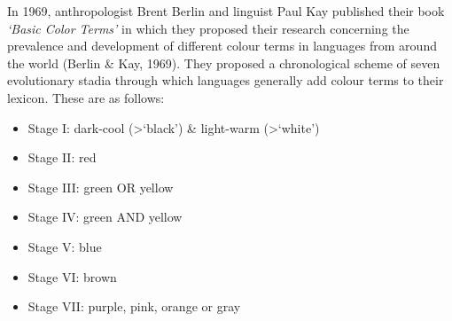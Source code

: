 
In 1969, anthropologist Brent Berlin and linguist Paul Kay published their book \textit{‘Basic Color Terms’} in which they proposed their research concerning the prevalence and development of different colour terms in languages from around the world (Berlin \& Kay, 1969). They proposed a chronological scheme of seven evolutionary stadia through which languages generally add colour terms to their lexicon. These are as follows: 

\begin{itemize}
\item Stage I: dark-cool (>‘black’) \& light-warm (>‘white’) 

\item Stage II: red 

\item Stage III:  green OR yellow 

\item Stage IV:  green AND yellow 

\item Stage V:  blue 

\item Stage VI:  brown 

\item Stage VII:  purple, pink, orange or gray 
\end{itemize}

